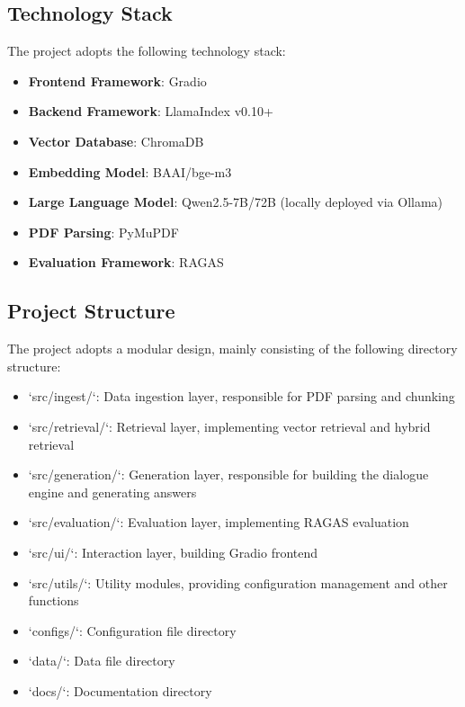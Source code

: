 \subsection{Technology Stack}

The project adopts the following technology stack:

\begin{itemize}
    \item \textbf{Frontend Framework}: Gradio
    \item \textbf{Backend Framework}: LlamaIndex v0.10+
    \item \textbf{Vector Database}: ChromaDB
    \item \textbf{Embedding Model}: BAAI/bge-m3
    \item \textbf{Large Language Model}: Qwen2.5-7B/72B (locally deployed via Ollama)
    \item \textbf{PDF Parsing}: PyMuPDF
    \item \textbf{Evaluation Framework}: RAGAS
\end{itemize}

\subsection{Project Structure}

The project adopts a modular design, mainly consisting of the following directory structure:

\begin{itemize}
    \item `src/ingest/`: Data ingestion layer, responsible for PDF parsing and chunking
    \item `src/retrieval/`: Retrieval layer, implementing vector retrieval and hybrid retrieval
    \item `src/generation/`: Generation layer, responsible for building the dialogue engine and generating answers
    \item `src/evaluation/`: Evaluation layer, implementing RAGAS evaluation
    \item `src/ui/`: Interaction layer, building Gradio frontend
    \item `src/utils/`: Utility modules, providing configuration management and other functions
    \item `configs/`: Configuration file directory
    \item `data/`: Data file directory
    \item `docs/`: Documentation directory
\end{itemize}

